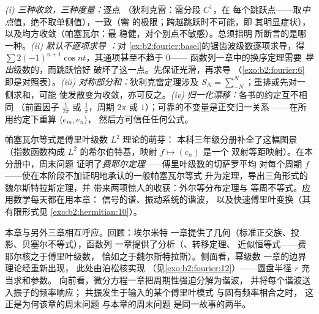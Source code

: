 \begin{remark}[常见误区]
\emph{(i) 三种收敛，三种度量：}逐点
（狄利克雷：需分段 $C^1$，在
每个跳跃点——取\emph{中点}值，绝不取单侧值），一致（需
的极限；跨越跳跃时不可能，即
其明显症状），以及均方收敛（帕塞瓦尔：最
稳健，对个别点不敏感）。总须指明
所断言的是哪一种。\emph{(ii) 默认不逐项求导
：}对
\cref{ex:b2:fourier:basel}的锯齿波级数逐项求导，得 $\sum
2(-1)^{n+1}\cos nt$，其通项甚至不趋于 $0$——
函数列一章中的换序定理需要
\emph{导出}级数的，而跳跃恰好
破坏了这一点。先保证光滑，再求导
（\cref{exo:b2:fourier:6} 即是对照表）。\emph{(iii)
对称部分和：}狄利克雷定理涉及 $S_N =
\sum_{-N}^{N}$；重排或先对一侧求和，可能
使发散变为收敛，亦可反之。\emph{(iv)
归一化漂移：}各书的约定互不相同
（前置因子 $\frac{1}{2\pi}$ 或 $\frac1\pi$，周期 $2\pi$ 或
$1$）；可靠的不变量是正交归一关系
——在所用约定下重算 $\langle e_m, e_n\rangle$，
然后方可信任任何公式。
\end{remark}

\begin{remark}[应用场合]
帕塞瓦尔等式是傅里叶级数 $L^2$ 理论的萌芽：
本科三年级分册补全了这幅图景（指数函数构成
$L^2$ 的希尔伯特基，映射 $f \mapsto (c_n)$ 是一个
双射等距映射）。在本分册中，周末问题
证明了\emph{费耶尔定理}——傅里叶级数的切萨罗平均
对每个周期
$f$ ——使在本阶段不加证明地承认的一般帕塞瓦尔等式
升为定理，导出三角形式的魏尔斯特拉斯定理，并
带来两项惊人的收获：外尔等分布定理与
等周不等式。应用数学每天都在用本章：
信号的谱、振动系统的谐波，
以及快速傅里叶变换（其有限形式见
\cref{exo:b2:hermitian:10}）。
\end{remark}

\begin{remark}[本分册中的视角]
本章与另外三章相互呼应。回顾：埃尔米特
一章提供了几何（标准正交族、投影、贝塞尔不等式），函数列
一章提供了分析（、转移定理、
近似恒等式——费耶尔核之于傅里叶级数，
恰如之于魏尔斯特拉斯）。侧面看，幂级数
一章的边界理论经重新出现，
此处由泊松核实现
（见\cref{exo:b2:fourier:12}）——圆盘半径 $r$ 充当求和参数。
向前看，微分方程一章把周期性强迫分解为谐波，
并将每个谐波送入振子的频率响应；
共振发生于输入的某个傅里叶模式
与固有频率相合之时，
这正是为何该章的周末问题
与本章的周末问题
是同一故事的两半。
\end{remark}

